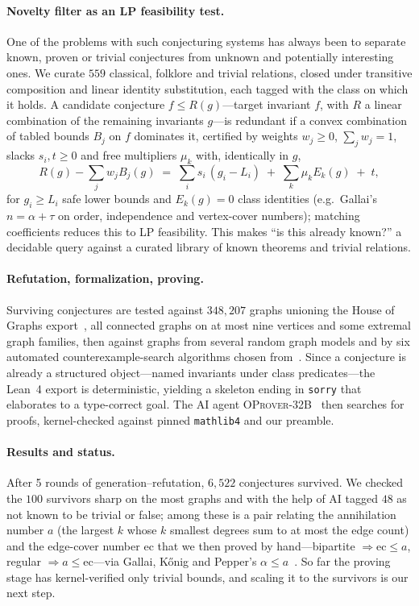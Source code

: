 \documentclass[runningheads]{llncs}
\begin{document}
\paragraph{Novelty filter as an LP feasibility test.}
One of the problems with such conjecturing systems has always been to separate known, proven or trivial conjectures from unknown and potentially interesting ones. We curate $559$ classical, folklore and trivial relations, closed under transitive composition and linear identity substitution, each tagged with the
class on which it holds. A candidate conjecture $f\le R(g)$---target invariant $f$, with $R$ a linear
combination of the remaining invariants $g$---is redundant if a convex
combination of tabled bounds $B_j$ on $f$
dominates it, certified by weights $w_j\ge0$, $\sum_j w_j=1$, slacks
$s_i,t\ge0$ and free multipliers $\mu_k$ with, identically in $g$,
\[
  R(g)-\sum_j w_j B_j(g)\;=\;\sum_i s_i\,(g_i-L_i)\;+\;\sum_k \mu_k E_k(g)\;+\;t ,
\]
for $g_i\ge L_i$ safe lower bounds and $E_k(g)=0$ class identities (e.g.\
Gallai's $n=\alpha+\tau$ on order, independence and vertex-cover numbers); matching coefficients reduces this to LP feasibility. This
makes ``is this already known?'' a decidable query against a curated library of known theorems and trivial relations.

\paragraph{Refutation, formalization, proving.}
Surviving conjectures are tested against $348{,}207$ graphs unioning the House
of Graphs export~\cite{coolsaet2023house}, all connected graphs on at most nine
vertices and some extremal graph families, then against graphs from several
random graph models and by six automated counterexample-search algorithms chosen
from~\cite{jooken2025computer}. Since a conjecture is already a structured
object---named invariants under class predicates---the Lean~4 export is
deterministic, yielding a skeleton ending in \texttt{sorry} that elaborates to a
type-correct goal. The AI agent \textsc{OProver-32B}~\cite{oprover2026} then
searches for proofs,
kernel-checked against pinned \texttt{mathlib4} and our preamble.

\paragraph{Results and status.}
After 5 rounds of generation--refutation, $6{,}522$ conjectures survived. We
checked the $100$ survivors
sharp on the most graphs and with the help of AI tagged $48$ as not known to be
trivial or false; among these is a pair relating the annihilation number $a$ (the
largest $k$ whose $k$ smallest degrees sum to at most the edge count) and the
edge-cover number $\mathrm{ec}$ that we then proved by hand---bipartite
$\Rightarrow\mathrm{ec}\le a$, regular $\Rightarrow a\le\mathrm{ec}$---via
Gallai, K\H{o}nig and Pepper's $\alpha\le a$~\cite{pepper2004thesis}. So far the
proving stage has kernel-verified only trivial bounds, and scaling it to the
survivors is our next step. 
\end{document}
